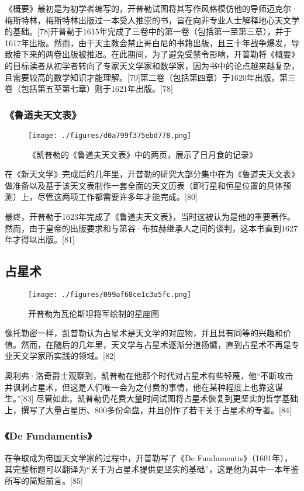 《概要》最初是为初学者编写的，开普勒试图将其写作风格模仿他的导师迈克尔·梅斯特林，梅斯特林出版过一本受人推崇的书，旨在向非专业人士解释地心天文学的基础。[78]开普勒于1615年完成了三卷中的第一卷（包括第一至第三章），并于1617年出版。然而，由于天主教会禁止哥白尼的书籍出版，且三十年战争爆发，导致接下来的两卷出版被推迟。在此期间，为了避免受禁令影响，开普勒将《概要》的目标读者从初学者转向了专家天文学家和数学家，因为书中的论点越来越复杂，且需要较高的数学知识才能理解。[79]第二卷（包括第四章）于1620年出版，第三卷（包括第五至第七章）则于1621年出版。[78]
\subsubsection{《鲁道夫天文表》}
\begin{figure}[ht]
\centering
\texttt{[image: ./figures/d0a799f375ebd778.png]}
\caption{《凯普勒的《鲁道夫天文表》中的两页，展示了日月食的记录》} \label{fig_KPL1_13}
\end{figure}
在《新天文学》完成后的几年里，开普勒的研究大部分集中在为《鲁道夫天文表》做准备以及基于该天文表制作一套全面的天文历表（即行星和恒星位置的具体预测）上，尽管这两项工作都需要许多年才能完成。[80]

最终，开普勒于1623年完成了《鲁道夫天文表》，当时这被认为是他的重要著作。然而，由于皇帝的出版要求和与第谷·布拉赫继承人之间的谈判，这本书直到1627年才得以出版。[81]
\subsection{占星术}
\begin{figure}[ht]
\centering
\texttt{[image: ./figures/099af68ce1c3a5fc.png]}
\caption{开普勒为瓦伦斯坦将军绘制的星座图} \label{fig_KPL1_14}
\end{figure}
像托勒密一样，凯普勒认为占星术是天文学的对应物，并且具有同等的兴趣和价值。然而，在随后的几年里，天文学与占星术逐渐分道扬镳，直到占星术不再是专业天文学家所实践的领域。[82]

奥利弗·洛奇爵士观察到，凯普勒在他那个时代对占星术有些轻蔑，他“不断攻击并讽刺占星术，但这是人们唯一会为之付费的事情，他在某种程度上也靠这谋生。”[83] 尽管如此，凯普勒仍花费大量时间试图将占星术恢复到更坚实的哲学基础上，撰写了大量占星历、800多份命盘，并且创作了若干关于占星术的专著。[84]
\subsubsection{《De Fundamentis》}
在争取成为帝国天文学家的过程中，开普勒写了《De Fundamentis》（1601年），其完整标题可以翻译为“关于为占星术提供更坚实的基础”，这是他为其中一本年鉴所写的简短前言。[85]

